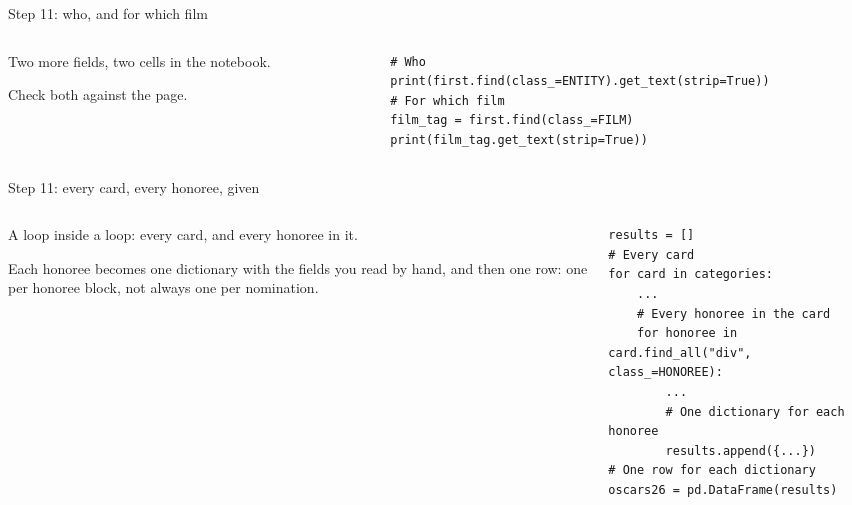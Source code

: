 \documentclass[9pt,aspectratio=169]{beamer}
\begin{document}
\begin{frame}[fragile]{Step 11: who, and for which film}
    \begin{columns}[T]
        \begin{column}{0.37\textwidth}
            Two more fields, two cells in the notebook.

            \medskip
            Check both against the page.
        \end{column}
        \begin{column}{0.6\textwidth}
\begin{lstlisting}
# Who
print(first.find(class_=ENTITY).get_text(strip=True))
# For which film
film_tag = first.find(class_=FILM)
print(film_tag.get_text(strip=True))
\end{lstlisting}
        \end{column}
    \end{columns}
\end{frame}

\begin{frame}[fragile]{Step 11: every card, every honoree, given}
    \begin{columns}[T]
        \begin{column}{0.37\textwidth}
            A loop inside a loop: every card, and every honoree in it.

            \medskip
            Each honoree becomes one dictionary with the fields you read by hand, and then one row: one per honoree block, not always one per nomination.
        \end{column}
        \begin{column}{0.6\textwidth}
\begin{lstlisting}
results = []
# Every card
for card in categories:
    ...
    # Every honoree in the card
    for honoree in card.find_all("div", class_=HONOREE):
        ...
        # One dictionary for each honoree
        results.append({...})
# One row for each dictionary
oscars26 = pd.DataFrame(results)
\end{lstlisting}
        \end{column}
    \end{columns}
\end{frame}
\end{document}
